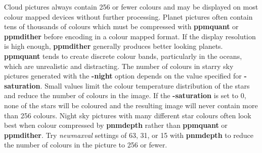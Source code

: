 \par
Cloud pictures always contain 256 or fewer colours and may be
displayed on most colour mapped devices without further processing.
Planet pictures often contain tens of thousands of colours which
must be compressed with
{\bf ppmquant}
or
{\bf ppmdither}
before encoding in a colour mapped format.  If the display resolution is
high enough,
{\bf ppmdither}
generally produces better looking planets.
{\bf ppmquant}
tends to create discrete colour bands, particularly in the oceans,
which are unrealistic and distracting.  The number of colours in starry
sky pictures generated with the
{\bf -night}
option depends on the value specified for
{\bf -saturation}{\rm .}
Small values limit the colour temperature distribution of the stars
and reduce the number of colours in the image.
If the
{\bf -saturation}
is set to 0, none of the stars will be coloured and the resulting
image will never contain more than 256 colours.
Night sky pictures with many different star colours often look
best when colour compressed by
{\bf pnmdepth}
rather than
{\bf ppmquant}
or
{\bf ppmdither}{\rm .}
Try
{\it newmaxval}
settings of 63, 31, or 15 with
{\bf pnmdepth}
to reduce the number of colours in the picture to 256 or fewer.

